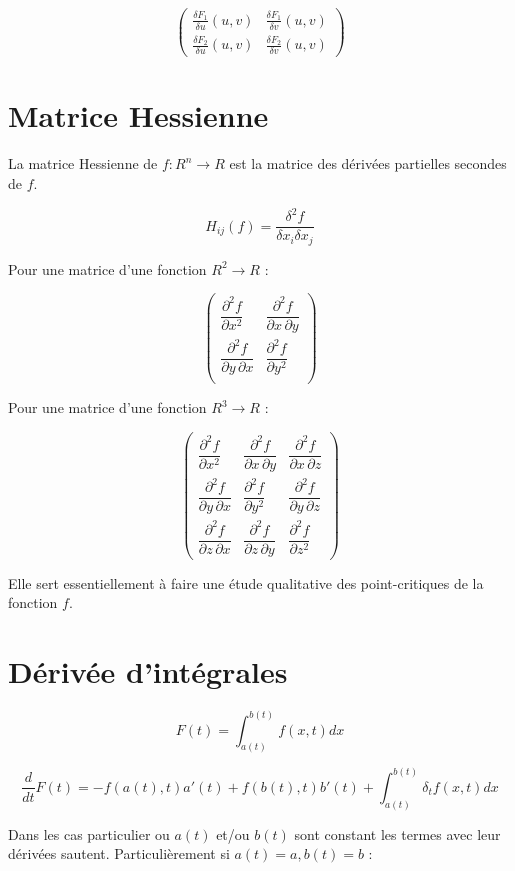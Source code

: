 \documentclass[12pt,a4paper]{report}
\begin{document}
$$
\begin{pmatrix}
\frac{\delta F_1}{\delta u}(u,v) & \frac{\delta F_1}{\delta v}(u,v) \\
\frac{\delta F_2}{\delta u}(u,v) & \frac{\delta F_2}{\delta v}(u,v)
\end{pmatrix}
$$
\section{Matrice Hessienne}

La matrice Hessienne de $f : R^n \to R$ est la matrice des dérivées partielles secondes de $f$.

$$H_{ij}(f) = \frac{\delta^2f}{\delta x_i\delta x_j}$$

Pour une matrice d'une fonction $R^2 \to R$ :

$$
\begin{pmatrix}
  \dfrac{\partial^2 f}{\partial x^2} & \dfrac{\partial^2 f}{\partial x\,\partial y}\\
  \dfrac{\partial^2 f}{\partial y\,\partial x} & \dfrac{\partial^2 f}{\partial y^2} \\[2.2ex]
\end{pmatrix}
$$

Pour une matrice d'une fonction $R^3 \to R$ :

$$
\begin{pmatrix}
  \dfrac{\partial^2 f}{\partial x^2} & \dfrac{\partial^2 f}{\partial x\,\partial y} & \dfrac{\partial^2 f}{\partial x\,\partial z} \\[2.2ex]
  \dfrac{\partial^2 f}{\partial y\,\partial x} & \dfrac{\partial^2 f}{\partial y^2} & \dfrac{\partial^2 f}{\partial y\,\partial z} \\[2.2ex]
  \dfrac{\partial^2 f}{\partial z\,\partial x} & \dfrac{\partial^2 f}{\partial z\,\partial y} & \dfrac{\partial^2 f}{\partial z^2}
\end{pmatrix}
$$


Elle sert essentiellement à faire une étude qualitative des point-critiques de la fonction $f$.

\section{Dérivée d'intégrales}

$$F(t) = \int_{a(t)}^{b(t)} f(x,t)dx $$

$$\frac{d}{dt} F(t) = -f(a(t),t)a'(t) + f(b(t),t)b'(t) + \int_{a(t)}^{b(t)} \delta _t f(x,t) dx$$

Dans les cas particulier ou $a(t)$ et/ou $b(t)$ sont constant les termes avec leur dérivées sautent. Particulièrement si $a(t) = a, b(t) = b$ :
\end{document}
